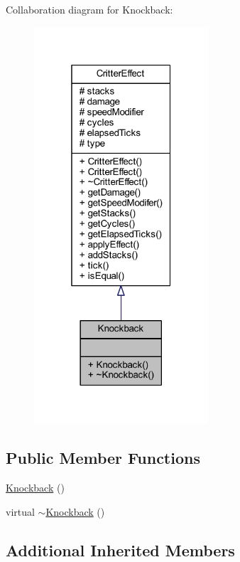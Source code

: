 Collaboration diagram for Knockback\+:\nopagebreak
\begin{figure}[H]
\begin{center}
\leavevmode
\includegraphics[width=184pt]{struct_knockback__coll__graph}
\end{center}
\end{figure}
\subsection*{Public Member Functions}
\begin{DoxyCompactItemize}
\item 
\hyperlink{struct_knockback_a67a91ac59578034add46e9c4dbcbad66}{Knockback} ()
\item 
virtual \hyperlink{struct_knockback_af64369e1d88b1008a3217ab372564973}{$\sim$\+Knockback} ()
\end{DoxyCompactItemize}
\subsection*{Additional Inherited Members}


